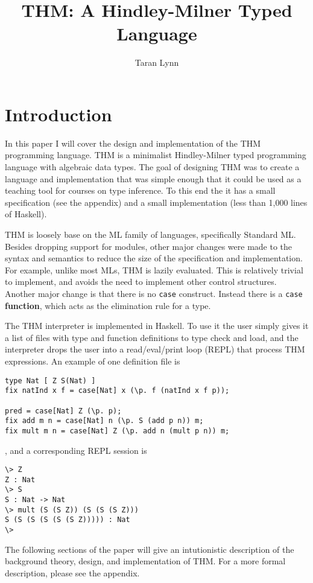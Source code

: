 \documentclass[12pt]{article}
\title{THM: A Hindley-Milner Typed Language}
\author{Taran Lynn}
\begin{document}
\maketitle


\section{Introduction}

In this paper I will cover the design and implementation of the THM
programming language.
THM is a minimalist Hindley-Milner typed
programming language with algebraic data types.
The goal of designing THM was to create a language and implementation
that was simple enough that it could be used as a teaching tool for
courses on type inference.
To this end the it has a small specification (see the appendix) and a
small implementation (less than 1,000 lines of Haskell).

THM is loosely base on the ML family of languages, specifically
Standard ML.
Besides dropping support for modules, other major changes were made to
the syntax and semantics to reduce the size of the specification and
implementation.
For example, unlike most MLs, THM is lazily evaluated.
This is relatively trivial to implement, and avoids the need to
implement other control structures.
Another major change is that there is no \verb~case~ construct.
Instead there is a \verb~case~ \textbf{function}, which acts as the
elimination rule for a type.

The THM interpreter is implemented in Haskell.
To use it the user simply gives it a list of files with type and
function definitions to type check and load, and the interpreter drops
the user into a read/eval/print loop (REPL) that process THM
expressions.
An example of one definition file is
\begin{verbatim}
type Nat [ Z S(Nat) ]
fix natInd x f = case[Nat] x (\p. f (natInd x f p));

pred = case[Nat] Z (\p. p);
fix add m n = case[Nat] n (\p. S (add p n)) m;
fix mult m n = case[Nat] Z (\p. add n (mult p n)) m;
\end{verbatim}
, and a corresponding REPL session is
\begin{verbatim}
\> Z
Z : Nat
\> S
S : Nat -> Nat
\> mult (S (S Z)) (S (S (S Z)))
S (S (S (S (S (S Z))))) : Nat
\>
\end{verbatim}

The following sections of the paper will give an intutionistic
description of the background theory, design, and implementation of
THM.
For a more formal description, please see the appendix.
\end{document}
